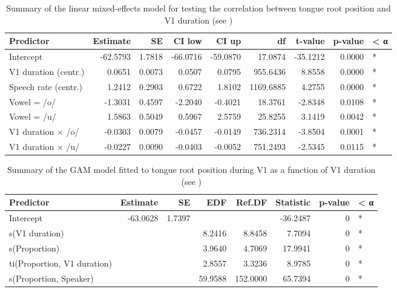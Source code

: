 \documentclass[12pt,]{article}
\begin{document}
\begin{table}[t]

\caption{\label{tab:tra-lm-2-table}Summary of the linear mixed-effects model for testing the correlation between tongue root position and V1 duration  (see )}
\centering
\fontsize{10}{12}\selectfont
\begin{tabular}{lrrrrrrrl}
\toprule
Predictor & Estimate & SE & CI low & CI up & df & t-value & p-value & < α\\
\midrule
Intercept & -62.5793 & 1.7818 & -66.0716 & -59.0870 & 17.0874 & -35.1212 & 0.0000 & *\\
V1 duration (centr.) & 0.0651 & 0.0073 & 0.0507 & 0.0795 & 955.6436 & 8.8558 & 0.0000 & *\\
Speech rate (centr.) & 1.2412 & 0.2903 & 0.6722 & 1.8102 & 1169.6885 & 4.2755 & 0.0000 & *\\
Vowel = /o/ & -1.3031 & 0.4597 & -2.2040 & -0.4021 & 18.3761 & -2.8348 & 0.0108 & *\\
Vowel = /u/ & 1.5863 & 0.5049 & 0.5967 & 2.5759 & 25.8255 & 3.1419 & 0.0042 & *\\
V1 duration × /o/ & -0.0303 & 0.0079 & -0.0457 & -0.0149 & 736.2314 & -3.8504 & 0.0001 & *\\
V1 duration × /u/ & -0.0227 & 0.0090 & -0.0403 & -0.0052 & 751.2493 & -2.5345 & 0.0115 & *\\
\bottomrule
\end{tabular}
\end{table}

\begin{table}[t]

\caption{\label{tab:tra-gam-ar-2-table}Summary of the GAM model fitted to tongue root position during V1 as a function of V1 duration (see )}
\centering
\fontsize{10}{12}\selectfont
\begin{tabular}{lrrrrrrl}
\toprule
Predictor & Estimate & SE & EDF & Ref.DF & Statistic & p-value & < α\\
\midrule
Intercept & -63.0628 & 1.7397 &  &  & -36.2487 & 0 & *\\
s(V1 duration) &  &  & 8.2416 & 8.8458 & 7.7094 & 0 & *\\
s(Proportion) &  &  & 3.9640 & 4.7069 & 17.9941 & 0 & *\\
ti(Proportion, V1 duration) &  &  & 2.8557 & 3.3236 & 8.9785 & 0 & *\\
s(Proportion, Speaker) &  &  & 59.9588 & 152.0000 & 65.7394 & 0 & *\\
\bottomrule
\end{tabular}
\end{table}


\end{document}
